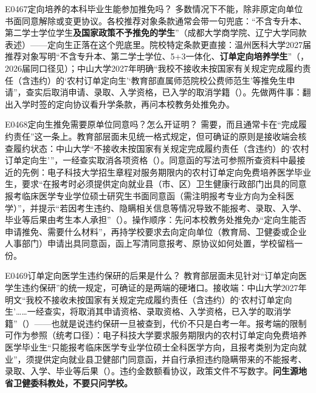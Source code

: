\begin{qa}{E0467}{定向培养的本科毕业生能参加推免吗？}
多数情况下不能，除非原定向单位书面同意解除或变更协议。各校推荐对象条款通常会带一句兜底：“不含专升本、第二学士学位学生\textbf{及国家政策不予推免的学生}”（成都大学商学院、辽宁大学同款表述）——定向生正落在这个兜底里。院校特定条款更直接：温州医科大学2027届推荐对象写明“不含专升本、第二学士学位、5+3一体化、\textbf{订单定向培养学生}”（，2026届同口径见）；中山大学2027年明确“我校不接收未按国家有关规定完成履约责任（含违约）的‘农村订单定向生’‘教育部直属师范院校公费师范生’等推免生申请”，查实后取消申请、录取、入学资格，已入学的取消学籍（）。先做两件事：翻出入学时签的定向协议看升学条款，再问本校教务处推免办。
\end{qa}

\begin{qa}{E0468}{定向生推免需要原单位同意吗？怎么开证明？}
需要，而且通常卡在“完成履约责任”这一条上。教育部层面未见统一格式规定，但可确证的原则是接收端会核查履约状态：中山大学“不接收未按国家有关规定完成履约责任（含违约）的‘农村订单定向生’”，一经查实取消各项资格（）。同意函的写法可参照所查资料中最接近的先例：电子科技大学招生章程对服务期限内的农村订单定向免费培养医学毕业生，要求“在报考时必须提供定向就业县（市、区）卫生健康行政部门出具的同意报考临床医学专业学位硕士研究生书面同意函（需注明报考专业方向为全科医学）”，并提示“若因考生违约、隐瞒相关信息等情况导致不能报考、录取、入学、毕业等后果由考生本人承担”（）。操作顺序：先问本校教务处推免办“定向生能否申请推免、需要什么材料”，再持学校要求去向定向单位（教育局、卫健委或企业人事部门）申请出具同意函，函上写清同意报考、原协议如何处置，学校留档一份。
\end{qa}

\begin{qa}{E0469}{订单定向医学生违约保研的后果是什么？}
教育部层面未见针对“订单定向医学生违约保研”的统一规定，可确证的是两端的硬堵口。接收端：中山大学2027年明文“我校不接收未按国家有关规定完成履约责任（含违约）的‘农村订单定向生’……一经查实，将取消其申请资格、录取资格、入学资格，已入学的取消学籍”（）——也就是说违约保研一旦被查到，代价不只是白考一年。报考端的限制可作为参照（统考口径）：电子科技大学要求服务期限内的农村订单定向免费培养医学毕业生“只能报考临床医学专业学位硕士全科医学方向，且报考类别为定向就业”，须提供定向就业县卫健部门同意函，并自行承担违约隐瞒带来的不能报考、录取、入学、毕业等后果（）。违约金数额看协议，政策文件不写数字。\textbf{问生源地省卫健委科教处，不要只问学校。}
\end{qa}

